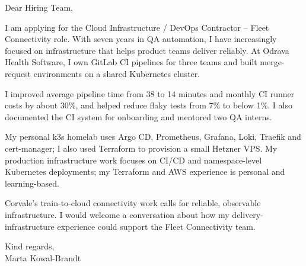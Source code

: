 \documentclass[11pt,a4paper]{article}
\begin{document}
Dear Hiring Team,

I am applying for the Cloud Infrastructure / DevOps Contractor – Fleet Connectivity role. With seven years in QA automation, I have increasingly focused on infrastructure that helps product teams deliver reliably. At Odrava Health Software, I own GitLab CI pipelines for three teams and built merge-request environments on a shared Kubernetes cluster.

I improved average pipeline time from 38 to 14 minutes and monthly CI runner costs by about 30\%, and helped reduce flaky tests from 7\% to below 1\%. I also documented the CI system for onboarding and mentored two QA interns.

My personal k3s homelab uses Argo CD, Prometheus, Grafana, Loki, Traefik and cert-manager; I also used Terraform to provision a small Hetzner VPS. My production infrastructure work focuses on CI/CD and namespace-level Kubernetes deployments; my Terraform and AWS experience is personal and learning-based.

Corvale’s train-to-cloud connectivity work calls for reliable, observable infrastructure. I would welcome a conversation about how my delivery-infrastructure experience could support the Fleet Connectivity team.

Kind regards,\\
Marta Kowal-Brandt
\end{document}
